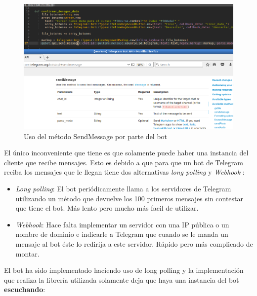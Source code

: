 \begin{figure}[H] %
\centering
\includegraphics[scale=0.42]{imagenes/random/Screenshot_2017-08-27_08-16-42.png}  %

\caption{Uso del método SendMessage por parte del bot }\label{figura531}
\end{figure}
El único inconveniente que tiene es que solamente puede haber una instancia del cliente que recibe mensajes. Esto es debido a que para que un bot de Telegram reciba los mensajes que le llegan tiene dos alternativas \textit{long polling} y \textit{Webhook} :
\begin{itemize}
\item \textit{Long polling}: El bot periódicamente llama a los servidores de Telegram utilizando un método que devuelve los 100 primeros mensajes  sin contestar que tiene el bot. Más lento pero mucho más facil de utilizar.
\item \textit{Webhook}: Hace falta implementar un servidor con una IP pública o un nombre de dominio e indicarle a Telegram que cuando se le manda un mensaje al bot éste lo redirija a este servidor. Rápido pero más complicado de montar.
\end{itemize}

El bot ha sido implementado haciendo uso de long polling y la implementación que realiza la librería utilizada  solamente deja que haya una instancia del bot \textbf{escuchando}:


